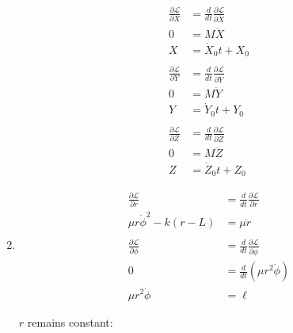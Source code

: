 \documentclass{article}
\begin{document}
\begin{enumerate}
        \begin{align*}
          \frac{\partial \mathcal{L}}{\partial X} & = \frac{d}{d t} \frac{\partial \mathcal{L}}{\partial \dot{X}} \\
          0                                       & = M \ddot{X}                                                  \\
          X                                       & = \dot{X}_0 t + X_0                                           \\ \\
          \frac{\partial \mathcal{L}}{\partial Y} & = \frac{d}{d t} \frac{\partial \mathcal{L}}{\partial \dot{Y}} \\
          0                                       & = M \ddot{Y}                                                  \\
          Y                                       & = \dot{Y}_0 t + Y_0                                           \\ \\
          \frac{\partial \mathcal{L}}{\partial Z} & = \frac{d}{d t} \frac{\partial \mathcal{L}}{\partial \dot{Z}} \\
          0                                       & = M \ddot{Z}                                                  \\
          Z                                       & = \dot{Z}_0 t + Z_0
        \end{align*}

  \item

        \begin{align*}
          \frac{\partial \mathcal{L}}{\partial r}    & = \frac{d}{d t} \frac{\partial \mathcal{L}}{\partial \dot{r}}    \\
          \mu r \dot{\phi}^2 - k (r - L)             & = \mu \ddot{r}                                                   \\ \\
          \frac{\partial \mathcal{L}}{\partial \phi} & = \frac{d}{d t} \frac{\partial \mathcal{L}}{\partial \dot{\phi}} \\
          0                                          & = \frac{d}{d t} (\mu r^2 \dot{\phi})                             \\
          \mu r^2 \dot{\phi}                         & = \ell
        \end{align*}

        $r$ remains constant:


\end{enumerate}
\end{document}
